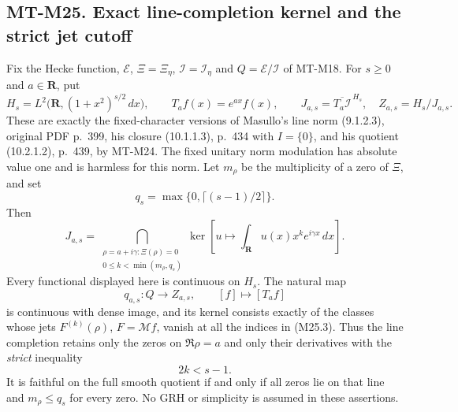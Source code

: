 \subsection*{MT-M25. Exact line-completion kernel and the strict jet cutoff}
Fix the Hecke function, $\mathcal E$, $\Xi=\Xi_\eta$,
$\mathcal I=\mathcal I_\eta$ and $Q=\mathcal E/\mathcal I$
of MT-M18. For $s\ge0$ and $a\in\mathbf R$, put
\[
 H_s=L^2\bigl(\mathbf R,(1+x^2)^{s/2}\,dx\bigr),
 \qquad T_af(x)=e^{ax}f(x),
 \qquad J_{a,s}=\overline{T_a\mathcal I}^{\,H_s},
 \quad Z_{a,s}=H_s/J_{a,s}.
 \tag{M25.1}
\]
These are exactly the fixed-character versions of Masullo's
line norm (9.1.2.3), original PDF p.~399, his closure
(10.1.1.3), p.~434 with $I=\{0\}$, and his quotient
(10.2.1.2), p.~439, by MT-M24. The fixed unitary norm
modulation has absolute value one and is harmless for this norm.
Let $m_\rho$ be the multiplicity of a zero of $\Xi$, and set
\[
       q_s=\max\{0,\lceil(s-1)/2\rceil\}.
 \tag{M25.2}
\]
Then
\[
 J_{a,s}=
 \bigcap_{\substack{\rho=a+i\gamma:\Xi(\rho)=0\\
                    0\le k<\min(m_\rho,q_s)}}
 \ker\left[u\longmapsto\int_{\mathbf R}
                  u(x)x^k e^{i\gamma x}\,dx\right].
 \tag{M25.3}
\]
Every functional displayed here is continuous on $H_s$.
The natural map
\[
 q_{a,s}:Q\longrightarrow Z_{a,s},\qquad[f]\longmapsto[T_af]
 \tag{M25.4}
\]
is continuous with dense image, and its kernel consists exactly
of the classes whose jets $F^{(k)}(\rho)$, $F=\mathcal Mf$,
vanish at all the indices in (M25.3). Thus the line completion
retains only the zeros on $\Re\rho=a$ and only their derivatives
with the \emph{strict} inequality
\[
                         2k<s-1.
 \tag{M25.5}
\]
It is faithful on the full smooth quotient if and only if all
zeros lie on that line and $m_\rho\le q_s$ for every zero.
No GRH or simplicity is assumed in these assertions.

